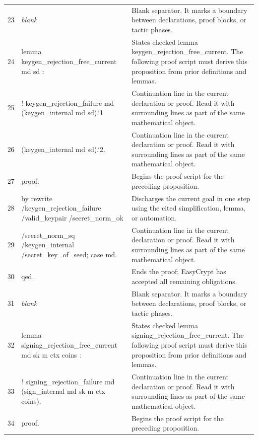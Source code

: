 \documentclass[10pt]{article}
\begin{document}
\begin{longtable}{r L{0.53\textwidth} L{0.37\textwidth}}
23 & {\ttfamily\scriptsize \emph{blank}} & Blank separator.  It marks a boundary between declarations, proof blocks, or tactic phases. \\
24 & {\ttfamily\scriptsize lemma keygen\_rejection\_free\_current md sd :} & States checked lemma keygen\_rejection\_free\_current.  The following proof script must derive this proposition from prior definitions and lemmas. \\
25 & {\ttfamily\scriptsize   ! keygen\_rejection\_failure md (keygen\_internal md sd).`1} & Continuation line in the current declaration or proof.  Read it with surrounding lines as part of the same mathematical object. \\
26 & {\ttfamily\scriptsize       (keygen\_internal md sd).`2.} & Continuation line in the current declaration or proof.  Read it with surrounding lines as part of the same mathematical object. \\
27 & {\ttfamily\scriptsize proof.} & Begins the proof script for the preceding proposition. \\
28 & {\ttfamily\scriptsize by rewrite /keygen\_rejection\_failure /valid\_keypair /secret\_norm\_ok} & Discharges the current goal in one step using the cited simplification, lemma, or automation. \\
29 & {\ttfamily\scriptsize            /secret\_norm\_sq /keygen\_internal /secret\_key\_of\_seed; case md.} & Continuation line in the current declaration or proof.  Read it with surrounding lines as part of the same mathematical object. \\
30 & {\ttfamily\scriptsize qed.} & Ends the proof; EasyCrypt has accepted all remaining obligations. \\
31 & {\ttfamily\scriptsize \emph{blank}} & Blank separator.  It marks a boundary between declarations, proof blocks, or tactic phases. \\
32 & {\ttfamily\scriptsize lemma signing\_rejection\_free\_current md sk m ctx coins :} & States checked lemma signing\_rejection\_free\_current.  The following proof script must derive this proposition from prior definitions and lemmas. \\
33 & {\ttfamily\scriptsize   ! signing\_rejection\_failure md (sign\_internal md sk m ctx coins).} & Continuation line in the current declaration or proof.  Read it with surrounding lines as part of the same mathematical object. \\
34 & {\ttfamily\scriptsize proof.} & Begins the proof script for the preceding proposition. \\

\end{longtable}
\end{document}
